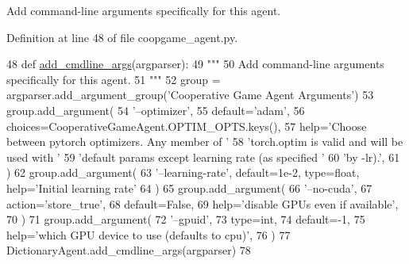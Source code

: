 \begin{DoxyVerb}Add command-line arguments specifically for this agent.
\end{DoxyVerb}
 

Definition at line 48 of file coopgame\+\_\+agent.\+py.


\begin{DoxyCode}
48     \textcolor{keyword}{def }\hyperlink{namespaceparlai_1_1agents_1_1drqa_1_1config_a62fdd5554f1da6be0cba185271058320}{add\_cmdline\_args}(argparser):
49         \textcolor{stringliteral}{"""}
50 \textcolor{stringliteral}{        Add command-line arguments specifically for this agent.}
51 \textcolor{stringliteral}{        """}
52         group = argparser.add\_argument\_group(\textcolor{stringliteral}{'Cooperative Game Agent Arguments'})
53         group.add\_argument(
54             \textcolor{stringliteral}{'--optimizer'},
55             default=\textcolor{stringliteral}{'adam'},
56             choices=CooperativeGameAgent.OPTIM\_OPTS.keys(),
57             help=\textcolor{stringliteral}{'Choose between pytorch optimizers. Any member of '}
58             \textcolor{stringliteral}{'torch.optim is valid and will be used with '}
59             \textcolor{stringliteral}{'default params except learning rate (as specified '}
60             \textcolor{stringliteral}{'by -lr).'},
61         )
62         group.add\_argument(
63             \textcolor{stringliteral}{'--learning-rate'}, default=1e-2, type=float, help=\textcolor{stringliteral}{'Initial learning rate'}
64         )
65         group.add\_argument(
66             \textcolor{stringliteral}{'--no-cuda'},
67             action=\textcolor{stringliteral}{'store\_true'},
68             default=\textcolor{keyword}{False},
69             help=\textcolor{stringliteral}{'disable GPUs even if available'},
70         )
71         group.add\_argument(
72             \textcolor{stringliteral}{'--gpuid'},
73             type=int,
74             default=-1,
75             help=\textcolor{stringliteral}{'which GPU device to use (defaults to cpu)'},
76         )
77         DictionaryAgent.add\_cmdline\_args(argparser)
78 
\end{DoxyCode}
\mbox{\label{classprojects_1_1taskntalk_1_1coopgame__agent_1_1CooperativeGameAgent_afa4b457e8d225f99cc97d30753dd1ff0}} 
